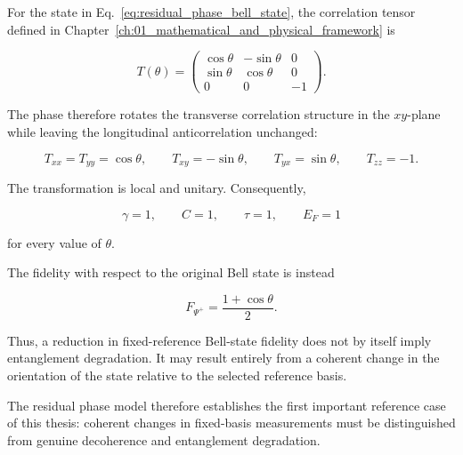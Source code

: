 For the state in Eq.~\eqref{eq:residual_phase_bell_state}, the correlation tensor
defined in Chapter~\ref{ch:01_mathematical_and_physical_framework} is

\begin{equation}
T(\theta)
=
\begin{pmatrix}
\cos\theta & -\sin\theta & 0\\
\sin\theta & \cos\theta & 0\\
0 & 0 & -1
\end{pmatrix}.
\label{eq:residual_phase_correlation_tensor}
\end{equation}

The phase therefore rotates the transverse correlation structure in the
\(xy\)-plane while leaving the longitudinal anticorrelation unchanged:

\begin{equation}
T_{xx}=T_{yy}=\cos\theta,
\qquad
T_{xy}=-\sin\theta,
\qquad
T_{yx}=\sin\theta,
\qquad
T_{zz}=-1.
\label{eq:residual_phase_tensor_components}
\end{equation}

The transformation is local and unitary. Consequently,

\begin{equation}
\gamma=1,
\qquad
C=1,
\qquad
\tau=1,
\qquad
E_F=1
\label{eq:residual_phase_invariant_metrics}
\end{equation}

for every value of \( \theta \).

The fidelity with respect to the original Bell state is instead

\begin{equation}
F_{\Psi^+}
=
\frac{1+\cos\theta}{2}.
\label{eq:residual_phase_fidelity}
\end{equation}

Thus, a reduction in fixed-reference Bell-state fidelity does not by itself imply
entanglement degradation. It may result entirely from a coherent change in the
orientation of the state relative to the selected reference basis.

The residual phase model therefore establishes the first important reference case
of this thesis: coherent changes in fixed-basis measurements must be distinguished
from genuine decoherence and entanglement degradation.


